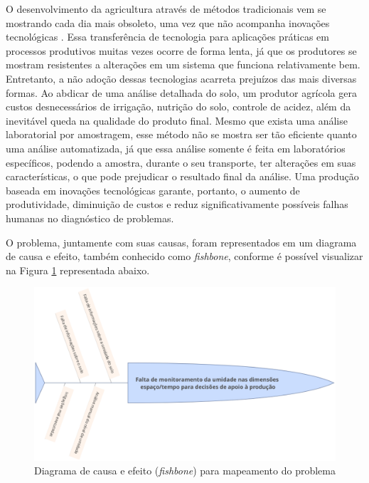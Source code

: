   O desenvolvimento da agricultura através de métodos tradicionais vem se
  mostrando cada dia mais obsoleto, uma vez que não acompanha inovações
  tecnológicas \cite{ROCHA2015}. Essa transferência de tecnologia para aplicações
  práticas em processos produtivos muitas vezes ocorre de forma lenta, já que
  os produtores se mostram resistentes a alterações em um sistema que funciona
  relativamente bem. Entretanto, a não adoção dessas tecnologias acarreta
  prejuízos das mais diversas formas. Ao abdicar de uma análise detalhada do
  solo, um produtor agrícola gera custos desnecessários de irrigação, nutrição
  do solo, controle de acidez, além da inevitável queda na qualidade do produto
  final. Mesmo que exista uma análise laboratorial por amostragem, esse método
  não se mostra ser tão eficiente quanto uma análise automatizada, já que essa
  análise somente é feita em laboratórios específicos, podendo a amostra,
  durante o seu transporte, ter alterações em suas características, o que pode
  prejudicar o resultado final da análise. Uma produção baseada em inovações
  tecnológicas garante, portanto, o aumento de produtividade, diminuição de
  custos e reduz significativamente possíveis falhas humanas no diagnóstico de
  problemas.


  O problema, juntamente com suas causas, foram representados em um diagrama
  de causa e efeito, também conhecido como \textit{fishbone}, conforme é possível visualizar
  na Figura \ref{fig01} representada abaixo.

  \begin{figure}[h]
    \centering
    \includegraphics[keepaspectratio=true,scale=0.5]{figuras/fig01.eps}
    \caption{Diagrama de causa e efeito (\textit{fishbone}) para mapeamento do problema}
    \label{fig01}
  \end{figure}

